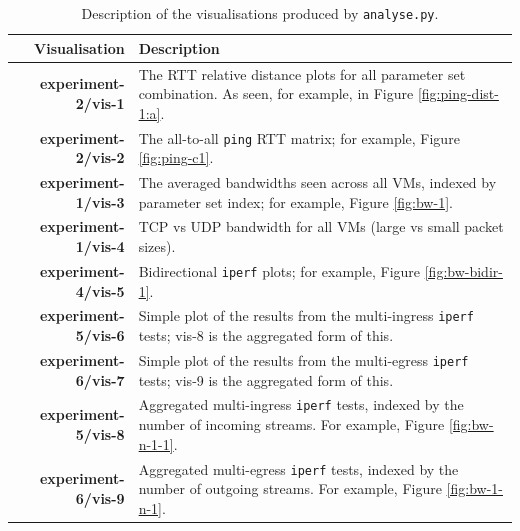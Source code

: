\documentclass[a4paper,10pt]{article}
\begin{document}
\begin{table}
\centering
\bgroup
    \def\arraystretch{1.5}%
    \begin{tabularx}{\textwidth}{r|X}
    \textbf{Visualisation} & Description \\
    \hline
    \textbf{experiment-2/vis-1} & The RTT relative distance plots for all parameter set combination. As seen, for example, in Figure \ref{fig:ping-dist-1:a}. \\ 
    \textbf{experiment-2/vis-2} & The all-to-all \texttt{ping} RTT matrix; for example, Figure \ref{fig:ping-c1}. \\ 
    \textbf{experiment-1/vis-3} & The averaged bandwidths seen across all VMs, indexed by parameter set index; for example, Figure \ref{fig:bw-1}. \\ 
    \textbf{experiment-1/vis-4} & TCP vs UDP bandwidth for all VMs (large vs small packet sizes). \\ 
    \textbf{experiment-4/vis-5} & Bidirectional \texttt{iperf} plots; for example, Figure \ref{fig:bw-bidir-1}. \\ 
    \textbf{experiment-5/vis-6} & Simple plot of the results from the multi-ingress \texttt{iperf} tests; vis-8 is the aggregated form of this. \\ 
    \textbf{experiment-6/vis-7} & Simple plot of the results from the multi-egress \texttt{iperf} tests; vis-9 is the aggregated form of this. \\ 
    \textbf{experiment-5/vis-8} & Aggregated multi-ingress \texttt{iperf} tests, indexed by the number of incoming streams. For example, Figure \ref{fig:bw-n-1-1}. \\ 
    \textbf{experiment-6/vis-9} & Aggregated multi-egress \texttt{iperf} tests, indexed by the number of outgoing streams. For example, Figure \ref{fig:bw-1-n-1}. \\ 
    \end{tabularx}
    \egroup
    \caption{Description of the visualisations produced by \texttt{analyse.py}.}
    \label{table:vis}
\end{table}

% 
\end{document}
